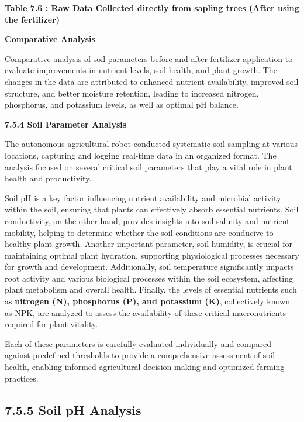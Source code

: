 \documentclass{book} %
\begin{document}
\textbf{Table 7.6 : Raw Data Collected directly from sapling trees (After using the fertilizer)}

\noindent 

\noindent \textbf{Comparative Analysis}

\noindent Comparative analysis of soil parameters before and after fertilizer application to evaluate improvements in nutrient levels, soil health, and plant growth. The changes in the data are attributed to enhanced nutrient availability, improved soil structure, and better moisture retention, leading to increased nitrogen, phosphorus, and potassium levels, as well as optimal pH balance.

\noindent \textbf{7.5.4 Soil Parameter Analysis}

\noindent The autonomous agricultural robot conducted systematic soil sampling at various locations, capturing and logging real-time data in an organized format. The analysis focused on several critical soil parameters that play a vital role in plant health and productivity. 

\noindent Soil  pH is a key factor influencing nutrient availability and microbial activity within the soil, ensuring that plants can effectively absorb essential nutrients. Soil conductivity, on the other hand, provides insights into soil salinity and nutrient mobility, helping to determine whether the soil conditions are conducive to healthy plant growth. Another important parameter, soil humidity, is crucial for maintaining optimal plant hydration, supporting physiological processes necessary for growth and development. Additionally, soil temperature significantly impacts root activity and various biological processes within the soil ecosystem, affecting plant metabolism and overall health. Finally, the levels of essential nutrients such as \textbf{nitrogen (N), phosphorus (P), and potassium (K)}, collectively known as NPK, are analyzed to assess the availability of these critical macronutrients required for plant vitality.

\noindent Each of these parameters is carefully evaluated individually and compared against predefined thresholds to provide a comprehensive assessment of soil health, enabling informed agricultural decision-making and optimized farming practices.

\noindent 
\subsection{7.5.5 Soil pH Analysis}
\end{document}
